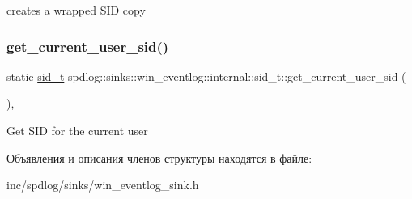 creates a wrapped S\+ID copy \mbox{\label{structspdlog_1_1sinks_1_1win__eventlog_1_1internal_1_1sid__t_ad6c8ed4cae2d0aae1d20339c5d4cbf53}} 
\subsubsection{\texorpdfstring{get\+\_\+current\+\_\+user\+\_\+sid()}{get\_current\_user\_sid()}}
{\footnotesize\ttfamily static \hyperlink{structspdlog_1_1sinks_1_1win__eventlog_1_1internal_1_1sid__t}{sid\+\_\+t} spdlog\+::sinks\+::win\+\_\+eventlog\+::internal\+::sid\+\_\+t\+::get\+\_\+current\+\_\+user\+\_\+sid (\begin{DoxyParamCaption}{ }\end{DoxyParamCaption})\hspace{0.3cm}{\ttfamily [inline]}, {\ttfamily [static]}}

Get S\+ID for the current user 

Объявления и описания членов структуры находятся в файле\+:\begin{DoxyCompactItemize}
\item 
inc/spdlog/sinks/win\+\_\+eventlog\+\_\+sink.\+h\end{DoxyCompactItemize}
